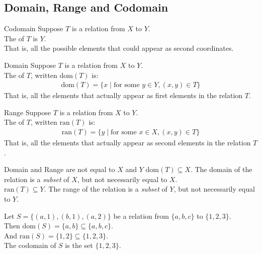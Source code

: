 \documentclass[../notes.tex]{subfiles}
\begin{document}
			\subsection{Domain, Range and Codomain}
			\begin{definition}{Codomain}
				Suppose $T$ is a relation from $X$ to $Y$.\\
				The  of $T$ is $Y$.\\
				That is, all the possible elements that could appear as second coordinates.
			\end{definition}
			\begin{definition}{Domain}
				Suppose $T$ is a relation from $X$ to $Y$.\\
				The  of $T$, written $\mathrm{dom}(T)$ is:
					\begin{align*}
						\mathrm{dom}(T) = \{x \mid \text{for some } y \in Y, (x, y) \in T\}
					\end{align*}
				That is, all the elements that actually appear as first elements in the relation $T$.
			\end{definition}
			\begin{definition}{Range}
				Suppose $T$ is a relation from $X$ to $Y$.\\
				The  of $T$, written $\mathrm{ran}(T)$ is:
					\begin{align*}
						\mathrm{ran}(T) = \{y \mid \text{for some } x \in X, (x, y) \in T\}
					\end{align*}
				That is, all the elements that actually appear as second elements in the relation $T$.
			\end{definition}
			\begin{sidenote}{Domain and Range are not equal to $X$ and $Y$}
				$\mathrm{dom}(T) \subseteq X$. The domain of the relation is a \emph{subset} of $X$, but not necessarily equal to $X$.\\
				$\mathrm{ran}(T) \subseteq Y$. The range of the relation is a \emph{subset} of $Y$, but not necessarily equal to $Y$.
			\end{sidenote}
			\begin{example}[width=0.83\textwidth]
				Let $S = \bigl\{(a, 1), (b, 1), (a, 2)\bigr\}$ be a relation from $\{a, b, c\}$ to $\{1, 2, 3\}$.\\
				Then $\mathrm{dom}(S) = \{a, b\} \subseteq \{a, b, c\}$.\\
				And $\mathrm{ran}(S) = \{1, 2\} \subseteq \{1, 2, 3\}$.\\
				The codomain of $S$ is the set $\{1, 2, 3\}$. 
			\end{example}
\end{document}
